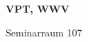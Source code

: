 \documentclass[a4paper]{article}
\begin{document}
\printGenericVSLHeader
\begin{center}
\begin{vsltext}{3cm}{4cm}

   \vspace{0.5cm} 

    \textbf{VPT, WWV} 

    \vspace{1.5cm}

    Seminarraum 107

\end{vsltext}

\end{center}
\end{document}
